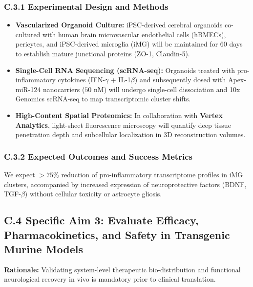 \documentclass[11pt,letterpaper]{article}
\begin{document}
\subsubsection{C.3.1 Experimental Design and Methods}
\begin{itemize}
  \item \textbf{Vascularized Organoid Culture:} iPSC-derived cerebral organoids co-cultured with human brain microvascular endothelial cells (hBMECs), pericytes, and iPSC-derived microglia (iMG) will be maintained for 60 days to establish mature junctional proteins (ZO-1, Claudin-5).
  \item \textbf{Single-Cell RNA Sequencing (scRNA-seq):} Organoids treated with pro-inflammatory cytokines (IFN-$\gamma$ + IL-1$\beta$) and subsequently dosed with Apex-miR-124 nanocarriers ($50\text{ nM}$) will undergo single-cell dissociation and 10x Genomics scRNA-seq to map transcriptomic cluster shifts.
  \item \textbf{High-Content Spatial Proteomics:} In collaboration with \textbf{Vertex Analytics}, light-sheet fluorescence microscopy will quantify deep tissue penetration depth and subcellular localization in 3D reconstruction volumes.
\end{itemize}

\subsubsection{C.3.2 Expected Outcomes and Success Metrics}
We expect $>75\%$ reduction of pro-inflammatory transcriptome profiles in iMG clusters, accompanied by increased expression of neuroprotective factors (BDNF, TGF-$\beta$) without cellular toxicity or astrocyte gliosis.

\subsection{C.4 Specific Aim 3: Evaluate Efficacy, Pharmacokinetics, and Safety in Transgenic Murine Models}
\textbf{Rationale:} Validating system-level therapeutic bio-distribution and functional neurological recovery in vivo is mandatory prior to clinical translation.
\end{document}
